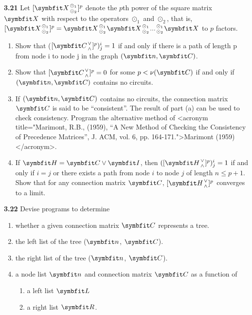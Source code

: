 \par \textbf{3.21} Let $[\mat{X}{\odot_1 \atop \odot_2}]^p$ denote the $p$th power of the square matrix $\mat{X}$ with respect to the operators $\odot_1$ and $\odot_2$, that is, $[\mat{X}{\odot_1 \atop \odot_2}]^p = \mat{X} {\odot_1 \atop \odot_2} \mat{X} {\odot_1 \atop \odot_2} ... {\odot_1 \atop \odot_2} \mat{X}$ to $p$ factors.

\begin{enumerate}[label=(\alph*)]
  \item Show that ($[\mat{C}{\vee \atop \wedge}]^p)_j^i = 1$ if and only if there is a path of length p from node i to node j in the graph $(\vect{n}, \mat{C})$.
  \item Show that $[\mat{C}{\vee \atop \wedge}]^p = 0$ for some $p < \nu(\mat{C})$ if and only if $(\vect{n}, \mat{C})$ contains no circuits.
  \item If $(\vect{n}, \mat{C})$ contains no circuits, the connection matrix $\mat{C}$ is said to be ``consistent''. The result of part (a) can be used to check consistency. Program the alternative method of
<acronym title="Marimont, R.B., (1959), “A New Method of Checking the Consistency of Precedence Matrices”, J. ACM, vol. 6, pp. 164-171.">Marimont (1959)</acronym>.
  \item If $\mat{H} = \mat{C} \vee \mat{I}$, then $([\mat{H}{\vee \atop \wedge}]^p)_j^i = 1$ if and only if $i = j$ or there exists a path from node $i$ to node $j$ of length $n ≤ p + 1$. Show that for any connection matrix $\mat{C}$, $[\mat{H}{\vee \atop \wedge}]^p$ converges to a limit.
\end{enumerate}


\par \textbf{3.22} Devise programs to determine

\begin{enumerate}[label=(\alph*)]
  \item whether a given connection matrix $\mat{C}$ represents a tree.
  \item the left list of the tree ($\vect{n}$, $\mat{C}$).
  \item the right list of the tree ($\vect{n}$, $\mat{C}$).
  \item a node list $\vect{n}$ and connection matrix $\mat{C}$ as a function of
  \begin{enumerate}[label=(\roman*)]
    \item a left list $\mat{L}$
    \item a right list $\mat{R}$.
  \end{enumerate}
\end{enumerate}



